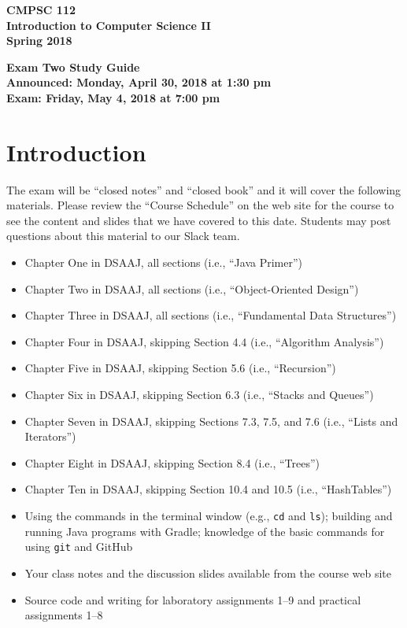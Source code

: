 \documentclass[11pt]{article}
\newcommand{\assignmentduedate}{May 4}
\newcommand{\assignmentassignedate}{April 30}
\newcommand{\assignmentnumber}{Two}
\newcommand{\labyear}{2018}
\newcommand{\assignedday}{Monday}
\newcommand{\dueday}{Friday}
\newcommand{\assignedtime}{1:30 pm}
\newcommand{\labtime}{7:00 pm}
\newcommand{\assigneddate}{Announced: \assignedday, \assignmentassignedate, \labyear{} at \assignedtime{}}
\newcommand{\duedate}{Exam: \dueday, \assignmentduedate, \labyear{} at \labtime{}}
\newcommand{\program}[1]{\lstinline{#1}}
\newcommand{\guidetitle}[1]
{
  \begin{center}
    \begin{center}
      \bf
      CMPSC 112\\Introduction to Computer Science II\\
      Spring 2018\\
      \medskip
    \end{center}
    \bf
    #1
  \end{center}
}
\begin{document}
\thispagestyle{empty}

\guidetitle{Exam \assignmentnumber{} Study Guide \\ \assigneddate{} \\ \duedate{}}

\section*{Introduction}

\noindent
The exam will be ``closed notes'' and ``closed book'' and it will cover the
following materials. Please review the ``Course Schedule'' on the web site for
the course to see the content and slides that we have covered to this date.
Students may post questions about this material to our Slack team.

\begin{itemize}

  \itemsep 0in

  \item Chapter One in DSAAJ, all sections (i.e., ``Java Primer'')

  \item Chapter Two in DSAAJ, all sections (i.e., ``Object-Oriented Design'')

  \item Chapter Three in DSAAJ, all sections (i.e., ``Fundamental Data Structures'')

  \item Chapter Four in DSAAJ, skipping Section 4.4 (i.e., ``Algorithm Analysis'')

  \item Chapter Five in DSAAJ, skipping Section 5.6 (i.e., ``Recursion'')

  \item Chapter Six in DSAAJ, skipping Section 6.3 (i.e., ``Stacks and Queues'')

  \item Chapter Seven in DSAAJ, skipping Sections 7.3, 7.5, and 7.6 (i.e., ``Lists and Iterators'')

  \item Chapter Eight in DSAAJ, skipping Section 8.4 (i.e., ``Trees'')

  \item Chapter Ten in DSAAJ, skipping Section 10.4 and 10.5 (i.e., ``HashTables'')

  \item Using the commands in the terminal window (e.g., \program{cd} and
    \program{ls}); building and running Java programs with Gradle; knowledge of
    the basic commands for using \program{git} and GitHub

  \item Your class notes and the discussion slides available from the course web
    site

  \item Source code and writing for laboratory assignments 1--9 and practical
    assignments 1--8

\end{itemize}
\end{document}
